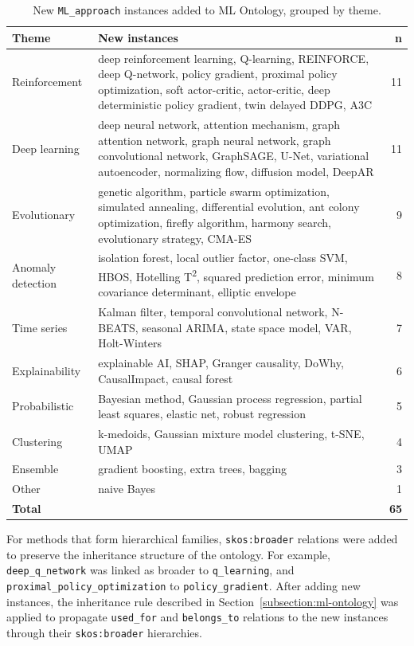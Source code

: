 \begin{table}[H]
\centering
\caption[New ML\_approach instances]{New \texttt{ML\_approach} instances added to ML Ontology, grouped by theme.}
\label{tab:new-ml-approaches}
\begin{tabularx}{\textwidth}{lXr}
\toprule
\textbf{Theme} & \textbf{New instances} & \textbf{n} \\
\midrule
Reinforcement
  & deep reinforcement learning, Q-learning, REINFORCE, deep Q-network, policy gradient, proximal policy optimization, soft actor-critic, actor-critic, deep deterministic policy gradient, twin delayed DDPG, A3C & 11 \\
\midrule
Deep learning
  & deep neural network, attention mechanism, graph attention network, graph neural network, graph convolutional network, GraphSAGE, U-Net, variational autoencoder, normalizing flow, diffusion model, DeepAR & 11 \\
\midrule
Evolutionary
  & genetic algorithm, particle swarm optimization, simulated annealing, differential evolution, ant colony optimization, firefly algorithm, harmony search, evolutionary strategy, CMA-ES & 9 \\
\midrule
Anomaly detection
  & isolation forest, local outlier factor, one-class SVM, HBOS, Hotelling T\textsuperscript{2}, squared prediction error, minimum covariance determinant, elliptic envelope & 8 \\
\midrule
Time series
  & Kalman filter, temporal convolutional network, N-BEATS, seasonal ARIMA, state space model, VAR, Holt-Winters & 7 \\
\midrule
Explainability
  & explainable AI, SHAP, Granger causality, DoWhy, CausalImpact, causal forest & 6 \\
\midrule
Probabilistic
  & Bayesian method, Gaussian process regression, partial least squares, elastic net, robust regression & 5 \\
\midrule
Clustering
  & k-medoids, Gaussian mixture model clustering, t-SNE, UMAP & 4 \\
\midrule
Ensemble
  & gradient boosting, extra trees, bagging & 3 \\
\midrule
Other
  & naive Bayes & 1 \\
\midrule
\textbf{Total} & & \textbf{65} \\
\bottomrule
\end{tabularx}
\end{table}

For methods that form hierarchical families, \texttt{skos:broader} 
relations were added to preserve the inheritance structure of the 
ontology. For example, \texttt{deep\_q\_network} was linked as 
broader to \texttt{q\_learning}, and 
\texttt{proximal\_policy\_optimization} to \texttt{policy\_gradient}. 
After adding new instances, the inheritance rule described in 
Section~\ref{subsection:ml-ontology} was applied to propagate 
\texttt{used\_for} and \texttt{belongs\_to} relations to the new 
instances through their \texttt{skos:broader} hierarchies.

